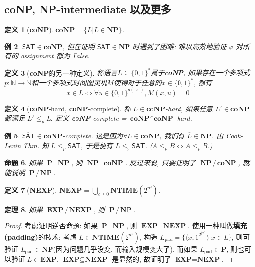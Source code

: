 \documentclass[8pt]{article}
\theoremstyle{compact}
\newtheorem{theorem}{定理}[section]
\newtheorem{definition}[theorem]{定义}
\newtheorem{proposition}[theorem]{命题}
\newtheorem{example}[theorem]{例}
\def\obj#1{\textbf{\uline{#1}}}
\def\le{\leqslant}
\def\ge{\geqslant}
\def\NTIME{\textbf{NTIME}}
\def\P{\textbf{P}}
\def\NP{\textbf{NP}}
\def\coNP{\textbf{coNP}}
\def\EXP{\textbf{EXP}}
\def\NEXP{\textbf{NEXP}}
\begin{document}
\subsection{\coNP, \NP-intermediate 以及更多}
\begin{definition}[\coNP]
	$\coNP = \{L | \overline{L} \in \NP\}$.
\end{definition}
\begin{example}
	$\overline{\textsf{SAT}} \in \coNP$, 但在证明 $\overline{\textsf{SAT}} \in \NP$ 时遇到了困难: 难以高效地验证 $\varphi$ 对所有的 assignment 都为 False.
\end{example}
\begin{definition}[\coNP 的另一种定义]
	称语言$L \subseteq \{0, 1\}^*$属于\coNP, 如果存在一个多项式$p: \mathbb N \to \mathbb N$和一个多项式时间图灵机$M$使得对于任意的$x \in \{0, 1\}^*$, 都有
	$$x \in L \Leftrightarrow \forall u \in \{0, 1\}^{p(|x|)}, M(x, u) = 0$$
\end{definition}
\begin{definition}[\coNP-hard, \coNP-complete]
	称 $L \in \coNP$-hard, 如果任意 $L' \in \coNP$ 都满足 $L' \le_p L.$ 定义 \coNP-complete = $\coNP \cap \coNP$-hard.
\end{definition}
\begin{example}
	$\overline{\textsf{SAT}} \in \coNP$-complete. 这是因为$\forall L \in \coNP$, 我们有 $\overline L \in \NP$. 由 Cook-Levin Thm. 知 $\overline L \le_p \textsf{SAT}$, 于是便有 $L \le_p \overline{\textsf{SAT}}$. ($A \le_p B \Leftrightarrow \overline A \le_p \overline B$.)
\end{example}
\begin{proposition}
	如果 $\P = \NP$, 则 $\NP = \coNP$. 反过来说, 只要证明了 $\NP \neq \coNP$, 就能说明 $\P \neq \NP$.
\end{proposition}
\begin{definition}[\NEXP]
	$\NEXP = \bigcup_{c \ge 0}\NTIME(2^{n^c})$.
\end{definition}
\begin{theorem}
	如果 $\EXP \neq \NEXP$, 则 $\P \neq \NP$.
\end{theorem}
\begin{proof}
	考虑证明逆否命题: 如果 $\P = \NP$, 则 $\EXP = \NEXP$. 使用一种叫做\obj{填充(padding)}的技术: 考虑 $L \in \NTIME(2^{n^c})$, 构造 $L_{\text{pad}} = \{\langle x, 1^{2^{|x|^c}}\rangle | x \in L\}$, 则可验证 $L_{\text{pad}} \in \NP$(因为问题几乎没变, 而输入规模变大了). 而如果 $L_{\text{pad}} \in \P$, 则也可以验证 $L \in \EXP$. $\EXP \subseteq \NEXP$ 是显然的, 故证明了 $\EXP = \NEXP$.
\end{proof}
\end{document}
